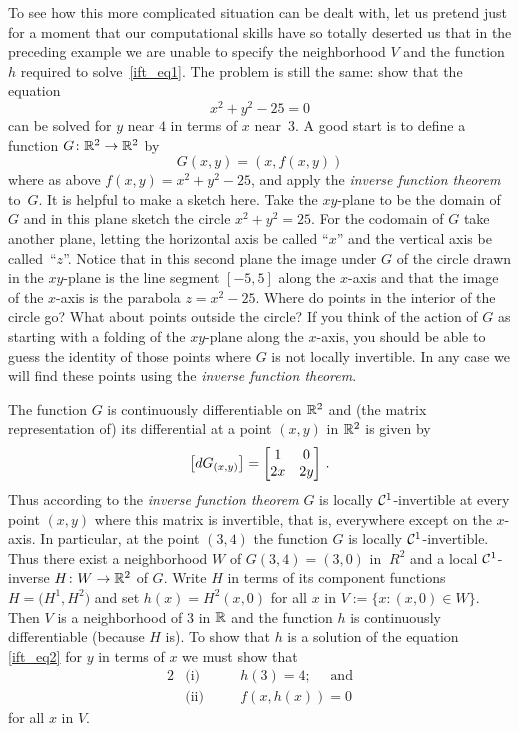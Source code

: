 To see how this more complicated situation can be dealt with, let us pretend just for a moment
that our computational skills have so totally deserted us that in the preceding example we are
unable to specify the neighborhood $V$ and the function $h$ required to solve~\eqref{ift_eq1}.
The problem is still the same: show that the equation
  \begin{equation}\label{ift_eq2}
     x^2 + y^2 - 25 = 0
  \end{equation}
can be solved for $y$ near $4$ in terms of $x$ near~$3$.  A good start is to define a function
$G \colon \mathbb{R}^2 \rightarrow \mathbb{R}^2$ by
   \begin{equation}\label{ift_eq3}
      G(x,y) = (x,f(x,y))
   \end{equation}
where as above $f(x,y) = x^2 + y^2 - 25$, and apply the \emph{inverse function theorem}
to~$G$.  It is helpful to make a sketch here.  Take the $xy$-plane to be the domain of $G$ and
in this plane sketch the circle $x^2 + y^2 = 25$.  For the codomain of $G$ take another plane,
letting the horizontal axis be called ``$x$'' and the vertical axis be called~``$z$''.  Notice
that in this second plane the image under $G$ of the circle drawn in the $xy$-plane is the
line segment $[- 5,5]$ along the $x$-axis and that the image of the $x$-axis is the parabola
$z = x^2 - 25$. Where do points in the interior of the circle go?  What about points outside
the circle? If you think of the action of $G$ as starting with a folding of the $xy$-plane
along the $x$-axis, you should be able to guess the identity of those points where $G$ is not
locally invertible.  In any case we will find these points using the \emph{inverse function
theorem}.

The function $G$ is continuously differentiable on $\mathbb{R}^2$ and (the matrix representation of)
its differential at a point $(x,y)$ in $\mathbb{R}^2$ is given by
  \[ \bigl[dG_{(x,y)}\bigr] = \bmatrix 1  & 0 \\ 2x & 2y \endbmatrix\,. \]
Thus according to the \emph{inverse function theorem} $G$ is locally $\mathcal{C}^1$-invertible at
every point $(x,y)$ where this matrix is invertible, that is, everywhere except on the
$x$-axis. In particular, at the point $(3,4)$ the function $G$ is locally $\mathcal{C}^1$-invertible. Thus there exist a neighborhood $W$ of $G(3,4) = (3,0)$ in $\ R^2$ and a
local $\mathcal{C}^1$-inverse $H \colon W \rightarrow \mathbb{R}^2$ of $G$.  Write $H$ in terms of its component
functions $H = \bigl(H^1,H^2\bigr)$ and set $h(x) = H^2(x,0)$ for all $x$ in $V := \{x:(x,0)
\in W\}$.  Then $V$ is a neighborhood of $3$ in $\mathbb{R}$ and the function $h$ is continuously
differentiable (because $H$ is). To show that $h$ is a solution of the equation
\eqref{ift_eq2} for $y$ in terms of $x$ we must show that
  \begin{alignat*}{2}
     &\text{(i)}  &&\quad h(3) = 4; \quad \text{ and} \\
     &\text{(ii)} &&\quad f(x,h(x)) = 0
  \end{alignat*}
for all $x$ in $V$.


